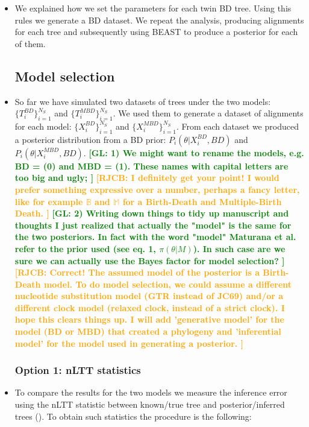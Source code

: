 \documentclass{article}
\newcommand*\richel[1]{\textcolor{orange}{\textbf{[RJCB: #1]}}}
\newcommand*\gio[1]{\textcolor{green}{\textbf{[GL: #1]}}}
\begin{document}
\begin{itemize}
\item We explained how we set the parameters for each twin BD tree. Using this rules we generate a BD dataset. We repeat the analysis, producing alignments for each tree and subsequently using BEAST to produce a posterior for each of them.

\subsection{Model selection}

\item So far we have simulated two datasets of trees under the two models: 
$\{T_{i}^{BD}\}_{i=1}^{N_{S}}$ and $\{T_{i}^{MBD}\}_{i=1}^{N_{S}}$.
We used them to generate a dataset of alignments for each model: $\{X^{BD}_{i}\}_{i=1}^{N_{S}}$ and $\{X^{MBD}_{i}\}_{i=1}^{N_{S}}$. From each dataset we produced a posterior distribution from a BD prior: 
$P_{i}(\theta | X^{BD}_{i}, BD)$ and $P_{i}(\theta | X^{MBD}_{i}, BD)$.
\gio{
  1) We might want to rename the models, e.g. BD = (0) and MBD = (1). These names with capital letters are too big and ugly;
}
\richel{
  I definitely get your point! 
  I would prefer something expressive over a number, perhaps a fancy letter, like
  for example $\mathbb{B}$ and $\mathbb{M}$ for a Birth-Death and Multiple-Birth Death. 
}
\gio{
2) Writing down things to tidy up manuscript and thoughts I just realized that 
  actually the "model" is the same for the two posteriors. 
  In fact with the word "model" Maturana et al. refer to the prior 
  used (see eq. 1, $\pi(\theta | M)$). In such case are we sure we can actually 
  use the Bayes factor for model selection?
}
\richel{
  Correct! The assumed model of the posterior is a Birth-Death model. To do
  model selection, we could assume a different nucleotide substitution 
  model (GTR instead of JC69) and/or a different clock model (relaxed clock,
  instead of a strict clock). I hope this clears things up. I will add
  'generative model' for the model (BD or MBD) that created a phylogeny
  and 'inferential model' for the model used in generating a posterior.
}

\subsubsection{Option 1: nLTT statistics}
\item To compare the results for the two models we measure the inference 
error using the nLTT statistic between known/true tree and 
posterior/inferred trees (\cite{nltt}). 
To obtain such statistics the procedure is the following:


\end{itemize}
\end{document}

